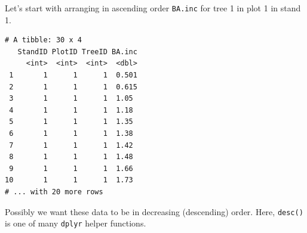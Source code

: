 \documentclass[]{krantz}
\makeatletter
\newenvironment{Shaded}{\begin{snugshade}}{\end{snugshade}}
\newcommand{\DecValTok}[1]{\textcolor[rgb]{0.06,0.06,0.06}{#1}}
\newcommand{\KeywordTok}[1]{\textcolor[rgb]{0.27,0.27,0.27}{\textbf{#1}}}
\newcommand{\NormalTok}[1]{#1}
\newcommand{\OperatorTok}[1]{\textcolor[rgb]{0.43,0.43,0.43}{\textbf{#1}}}
\newcommand{\StringTok}[1]{\textcolor[rgb]{0.5,0.5,0.5}{#1}}
\newenvironment{kframe}{%
\medskip{}
\setlength{\fboxsep}{.8em}
 \def\at@end@of@kframe{}%
 \ifinner\ifhmode%
  \def\at@end@of@kframe{\end{minipage}}%
  \begin{minipage}{\columnwidth}%
 \fi\fi%
 \def\FrameCommand##1{\hskip\@totalleftmargin \hskip-\fboxsep
 \colorbox{shadecolor}{##1}\hskip-\fboxsep
     \hskip-\linewidth \hskip-\@totalleftmargin \hskip\columnwidth}%
 \MakeFramed {\advance\hsize-\width
   \@totalleftmargin\z@ \linewidth\hsize
   \@setminipage}}%
 {\par\unskip\endMakeFramed%
 \at@end@of@kframe}
\renewenvironment{Shaded}{\begin{kframe}}{\end{kframe}}
\makeatother
\begin{document}
Let's start with arranging in ascending order \texttt{BA.inc} for tree 1 in plot 1 in stand 1.

\begin{Shaded}
\end{Shaded}

\begin{verbatim}
# A tibble: 30 x 4
   StandID PlotID TreeID BA.inc
     <int>  <int>  <int>  <dbl>
 1       1      1      1  0.501
 2       1      1      1  0.615
 3       1      1      1  1.05 
 4       1      1      1  1.18 
 5       1      1      1  1.35 
 6       1      1      1  1.38 
 7       1      1      1  1.42 
 8       1      1      1  1.48 
 9       1      1      1  1.66 
10       1      1      1  1.73 
# ... with 20 more rows
\end{verbatim}

Possibly we want these data to be in decreasing (descending) order. Here, \texttt{desc()} is one of many \texttt{dplyr} helper functions.

\begin{Shaded}
\end{Shaded}
\end{document}
